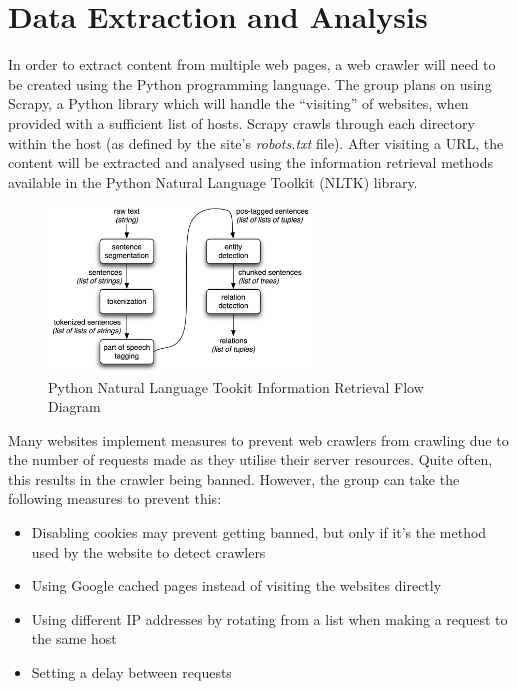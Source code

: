 \section{Data Extraction and Analysis}

In order to extract content from multiple web pages, a web crawler will need to be created using the Python programming language. The group plans on using Scrapy, a Python library which will handle the "`visiting"' of websites, when provided with a sufficient list of hosts. Scrapy crawls through each directory within the host (as defined by the site's \textsl{robots.txt} file). After visiting a URL, the content will be extracted and analysed using the information retrieval methods available in the Python Natural Language Toolkit (NLTK) library.

\begin{figure}
  \centering
  \begin{minipage}{7cm}
    \centering
    \includegraphics[width=7cm]{inc/ie-architecture.jpg}
    \caption{Python Natural Language Tookit Information Retrieval Flow Diagram}
    \label{fig:information_retrieval}
  \end{minipage}
\end{figure}

Many websites implement measures to prevent web crawlers from crawling due to the number of requests made as they utilise their server resources. Quite often, this results in the crawler being banned. However, the group can take the following measures to prevent this:

\begin{itemize}
  \item Disabling cookies may prevent getting banned, but only if it’s the method used by the website to detect crawlers
  \item Using Google cached pages instead of visiting the websites directly
  \item Using different IP addresses by rotating from a list when making a request to the same host
  \item Setting a delay between requests
\end{itemize}
